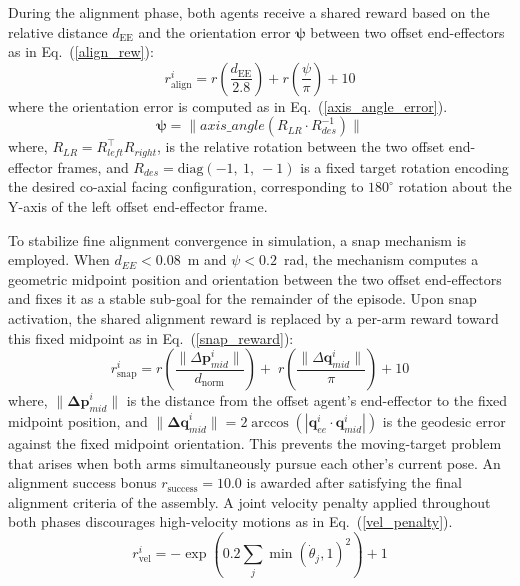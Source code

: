 \documentclass[lettersize,journal]{IEEEtran}
\begin{document}
\noindent During the alignment phase, both agents receive a shared reward based on the relative distance $d_{\text{EE}}$ and the orientation error $\mathbf{\psi}$ between two offset end-effectors as in Eq.~(\ref{align_rew}):
\begin{equation}
r^{i}_{\text{align}} = r\left(\frac{d_{\text{EE}}}{2.8}\right) + r\left(\frac{\psi}{\pi}\right) + 10
\label{align_rew}
\end{equation}
where the orientation error is computed as in Eq.~(\ref{axis_angle_error}).
\begin{equation}
    \mathbf{\psi} = \lVert axis\_angle(R_{LR}\cdot R^{-1}_{des})\rVert
    \label{axis_angle_error}
\end{equation}
\noindent where, $R_{LR} = R_{left}^{\top} R_{right}$, is the relative rotation between the two offset end-effector frames, and $R_{des} = \text{diag}(-1,\ 1,\ -1)$ is a fixed target rotation encoding the desired co-axial facing configuration, corresponding to $180^{\circ}$ rotation about the Y-axis of the left offset end-effector frame.

\noindent To stabilize fine alignment convergence in simulation, a snap mechanism is employed. When $d_{EE} < 0.08$~m and $\psi < 0.2$~rad, the mechanism computes a geometric midpoint position and orientation between the two offset end-effectors and fixes it as a stable sub-goal for the remainder of the episode. Upon snap activation, the shared alignment reward is replaced by a per-arm reward toward this fixed midpoint as in Eq.~(\ref{snap_reward}):
\begin{equation}
r^{i}_{\text{snap}} = 
r\left(\frac{\lVert \Delta \mathbf{p}_{mid}^i \rVert}{d_\text{norm}}\right) +\;
r\left(\frac{\lVert \Delta \mathbf{q}_{mid}^i \rVert}{\pi}\right) + 10
\label{snap_reward}
\end{equation}
where, $\|\mathbf{\Delta p}_{mid}^{i}\|$ is the distance from the offset agent's end-effector to the fixed midpoint position, and $\|\mathbf{\Delta q}_{mid}^{i}\| = 2\arccos(|\mathbf{q}_{ee}^{i} \cdot \mathbf{q}_{mid}^{i}|)$ is the geodesic error against the fixed midpoint orientation. This prevents the moving-target problem that arises when both arms simultaneously pursue each other's current pose. An alignment success bonus $r_{\text{success}} = 10.0$ is awarded after satisfying the final alignment criteria of the assembly. A joint velocity penalty applied throughout both phases discourages high-velocity motions as in Eq.~(\ref{vel_penalty}).
\begin{equation}
r^{i}_{\text{vel}} = -\exp\left( 0.2 \sum_{j} \min\left( \dot{\theta}_{j}, 1 \right)^{2} \right) + 1
\label{vel_penalty}
\end{equation}
\end{document}
